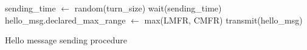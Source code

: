 		\begin{algorithm}[H]
			\begin{algorithmic}[1]
					\State sending\_time $\gets$ random(turn\_size)
					\State wait(sending\_time)
						\State hello\_msg.declared\_max\_range $\gets$ max(LMFR, CMFR)
						\State transmit(hello\_msg)
					\EndIf
				\EndFor
			\end{algorithmic}
			\caption{Hello message sending procedure}
		\end{algorithm}

		
		

